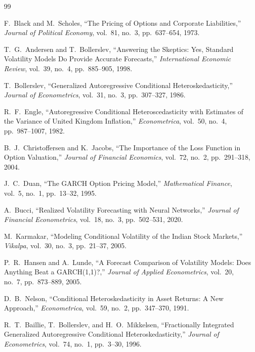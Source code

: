 \documentclass[12pt,a4paper]{article}
\begin{document}
\newpage
\begin{thebibliography}{99}

F.~Black and M.~Scholes, ``The Pricing of Options and Corporate Liabilities,'' \textit{Journal of Political Economy}, vol.~81, no.~3, pp.~637--654, 1973.

T.~G.~Andersen and T.~Bollerslev, ``Answering the Skeptics: Yes, Standard Volatility Models Do Provide Accurate Forecasts,'' \textit{International Economic Review}, vol.~39, no.~4, pp.~885--905, 1998.

T.~Bollerslev, ``Generalized Autoregressive Conditional Heteroskedasticity,'' \textit{Journal of Econometrics}, vol.~31, no.~3, pp.~307--327, 1986.

R.~F.~Engle, ``Autoregressive Conditional Heteroscedasticity with Estimates of the Variance of United Kingdom Inflation,'' \textit{Econometrica}, vol.~50, no.~4, pp.~987--1007, 1982.

B.~J.~Christoffersen and K.~Jacobs, ``The Importance of the Loss Function in Option Valuation,'' \textit{Journal of Financial Economics}, vol.~72, no.~2, pp.~291--318, 2004.

J.~C.~Duan, ``The GARCH Option Pricing Model,'' \textit{Mathematical Finance}, vol.~5, no.~1, pp.~13--32, 1995.

A.~Bucci, ``Realized Volatility Forecasting with Neural Networks,'' \textit{Journal of Financial Econometrics}, vol.~18, no.~3, pp.~502--531, 2020.

M.~Karmakar, ``Modeling Conditional Volatility of the Indian Stock Markets,'' \textit{Vikalpa}, vol.~30, no.~3, pp.~21--37, 2005.

P.~R.~Hansen and A.~Lunde, ``A Forecast Comparison of Volatility Models: Does Anything Beat a GARCH(1,1)?,'' \textit{Journal of Applied Econometrics}, vol.~20, no.~7, pp.~873--889, 2005.

D.~B.~Nelson, ``Conditional Heteroskedasticity in Asset Returns: A New Approach,'' \textit{Econometrica}, vol.~59, no.~2, pp.~347--370, 1991.

R.~T.~Baillie, T.~Bollerslev, and H.~O.~Mikkelsen, ``Fractionally Integrated Generalized Autoregressive Conditional Heteroskedasticity,'' \textit{Journal of Econometrics}, vol.~74, no.~1, pp.~3--30, 1996.


\end{thebibliography}
\end{document}
